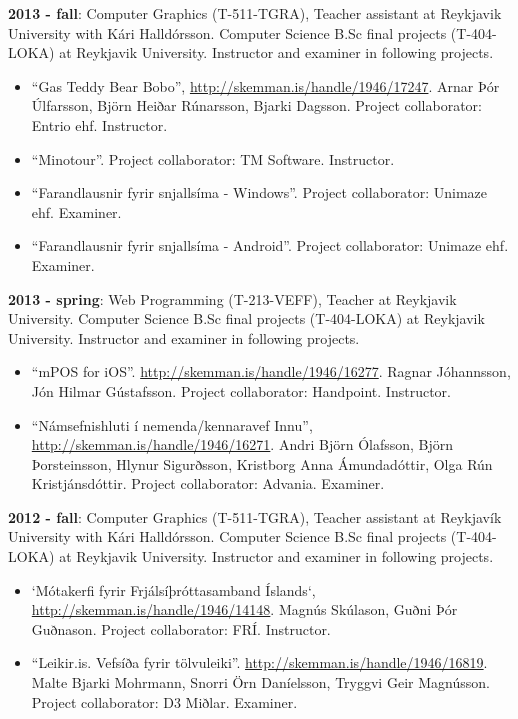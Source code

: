 \textbf{2013 - fall}: Computer Graphics (T-511-TGRA), Teacher assistant at Reykjavik University with Kári Halldórsson. Computer Science B.Sc final projects (T-404-LOKA) at Reykjavik University. Instructor and examiner in following projects.

\begin{itemize}
\item ``Gas Teddy Bear Bobo'', \url{http://skemman.is/handle/1946/17247}. Arnar Þór Úlfarsson, Björn Heiðar Rúnarsson, Bjarki Dagsson. Project collaborator: Entrio ehf. Instructor.

\item ``Minotour''. Project collaborator: TM Software. Instructor.

\item
``Farandlausnir fyrir snjallsíma - Windows''. Project collaborator: Unimaze ehf. Examiner.

\item
``Farandlausnir fyrir snjallsíma - Android''. Project collaborator: Unimaze ehf. Examiner.
\end{itemize}


\textbf{2013 - spring}: Web Programming (T-213-VEFF), Teacher at Reykjavik University. Computer Science B.Sc final projects (T-404-LOKA) at Reykjavik University. Instructor and examiner in following projects.

\begin{itemize}
\item ``mPOS for iOS''. \url{http://skemman.is/handle/1946/16277}. Ragnar Jóhannsson, Jón Hilmar Gústafsson. Project collaborator: Handpoint. Instructor.

\item ``Námsefnishluti í nemenda/kennaravef Innu'', \url{http://skemman.is/handle/1946/16271}. Andri Björn Ólafsson, Björn Þorsteinsson, Hlynur Sigurðsson, Kristborg Anna Ámundadóttir, Olga Rún Kristjánsdóttir. Project collaborator: Advania. Examiner. 
\end{itemize}


\textbf{2012 - fall}:
Computer Graphics (T-511-TGRA), Teacher assistant at Reykjavík University with Kári Halldórsson. Computer Science B.Sc final projects (T-404-LOKA) at Reykjavik University. Instructor and examiner in following projects.

\begin{itemize}
\item `Mótakerfi fyrir Frjálsíþróttasamband Íslands`, \url{http://skemman.is/handle/1946/14148}. Magnús Skúlason, Guðni Þór Guðnason. Project collaborator: FRÍ. Instructor.

\item ``Leikir.is. Vefsíða fyrir tölvuleiki''. \url{http://skemman.is/handle/1946/16819}. Malte Bjarki Mohrmann, Snorri Örn Daníelsson, Tryggvi Geir Magnússon. Project collaborator: D3 Miðlar. Examiner.
\end{itemize}


